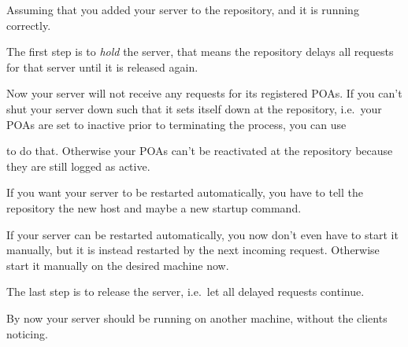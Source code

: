 \documentclass[12pt]{scrbook}
\begin{document}
Assuming  that you  added your  server to  the repository,  and  it is
running  correctly.


The first step is to {\em  hold} the server, that means the repository
delays all requests for that server until it is released again.


Now  your server  will not  receive  any requests  for its  registered
POAs. If you can't shut your server down such that it sets itself down
at  the repository,  i.e.~your POAs  are  set to  inactive prior  to
terminating the process, you can use


to  do  that.   Otherwise  your  POAs  can't  be  reactivated  at  the
repository because they are still logged as active.

If you  want your  server to be  restarted automatically, you  have to
tell the repository the new host and maybe a new startup command.


If your server can be restarted automatically, you now don't even have
to start it manually, but it is instead restarted by the next incoming
request.  Otherwise start it manually on the desired machine now.

The last step is to release  the server, i.e.~let all delayed requests
continue.


By now your  server should be running on  another machine, without the
clients noticing.
\end{document}

